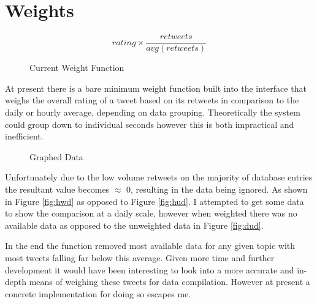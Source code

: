 \documentclass[12pt,a4paper]{report}
\begin{document}
  \section{Weights}
  \begin{figure}
    \[rating \times \frac{retweets}{avg(retweets)}\]
    \caption{Current Weight Function}
  \end{figure}
  At present there is a bare minimum weight function built into the interface that weighs the overall rating of a tweet based on its retweets in comparison to the daily or hourly average, depending on data grouping. Theoretically the system could group down to individual seconds however this is both impractical and inefficient.
  \par
  \begin{figure}[h]
    \centering
    \caption{Graphed Data}
    \label{fig:gd}
  \end{figure}
  Unfortunately due to the low volume retweets on the majority of database entries the resultant value becomes $\approx$ 0, resulting in the data being ignored. As shown in Figure \ref{fig:hwd} as opposed to Figure \ref{fig:hud}. I attempted to get some data to show the comparison at a daily scale, however when weighted there was no available data as opposed to the unweighted data in Figure \ref{fig:dud}.
  \par
  In the end the function removed most available data for any given topic with most tweets falling far below this average. Given more time and further development it would have been interesting to look into a more accurate and in-depth means of weighing these tweets for data compilation. However at present a concrete implementation for doing so escapes me.
\end{document}
